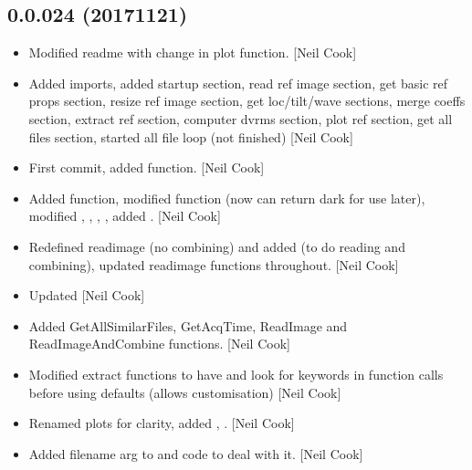 \documentclass[a4paper,10pt,english]{report}
\begin{document}
\subsection{0.0.024 (2017\sphinxhyphen{}11\sphinxhyphen{}21)}
\label{\detokenize{misc/changelog:id546}}\begin{itemize}
\item {} 
Modified readme with change in plot function. {[}Neil Cook{]}

\item {} 
Added imports, added startup section, read ref image section, get
basic ref props section, resize ref image section, get loc/tilt/wave
sections, merge coeffs section, extract ref section, computer dvrms
section, plot ref section, get all files section, started all file
loop (not finished) {[}Neil Cook{]}

\item {} 
First commit, added  function. {[}Neil Cook{]}

\item {} 
Added  function, modified 
function (now can return dark for use later), modified ,
, , , added . {[}Neil Cook{]}

\item {} 
Redefined readimage (no combining) and added  (to
do reading and combining), updated readimage functions throughout.
{[}Neil Cook{]}

\item {} 
Updated  {[}Neil Cook{]}

\item {} 
Added GetAllSimilarFiles, GetAcqTime, ReadImage and
ReadImageAndCombine functions. {[}Neil Cook{]}

\item {} 
Modified extract functions to have and look for keywords in function
calls before using defaults (allows customisation) {[}Neil Cook{]}

\item {} 
Renamed plots for clarity, added ,
. {[}Neil Cook{]}

\item {} 
Added filename arg to  and code to deal with it.
{[}Neil Cook{]}


\end{itemize}
\end{document}
